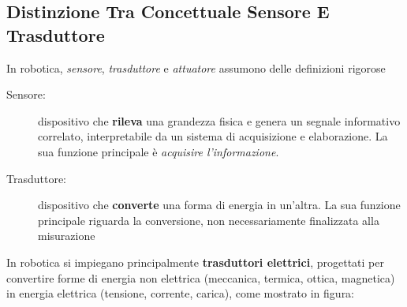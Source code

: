 ﻿\documentclass[11pt, a4paper]{article}
\begin{document}
\newpage

\subsection{Distinzione Tra Concettuale Sensore E Trasduttore}

In robotica, \textit{sensore}, \textit{trasduttore} e \textit{attuatore} assumono delle definizioni rigorose

\begin{description}
    \item[Sensore:] dispositivo che \textbf{rileva} una grandezza fisica e genera un segnale informativo correlato, interpretabile da un sistema di acquisizione e elaborazione. La sua funzione principale è \textit{acquisire l'informazione}.
    \item[Trasduttore:] dispositivo che \textbf{converte} una forma di energia in un'altra. La sua funzione principale riguarda la conversione, non necessariamente finalizzata alla misurazione
\end{description}

In robotica si impiegano principalmente \textbf{trasduttori elettrici}, progettati per convertire forme di energia non elettrica (meccanica, termica, ottica, magnetica) in energia elettrica (tensione, corrente, carica), come mostrato in figura:
\end{document}

